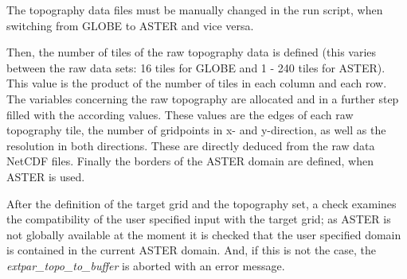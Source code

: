 \documentclass[a4paper,10pt,DIV14,BCOR1cm,titlepage,twoside]{scrartcl}
\begin{document}
The topography data files must be manually changed in the run script, when switching from GLOBE to ASTER and vice versa.\par\medskip\noindent
Then, the number of tiles of the raw topography data is defined (this varies between the raw data sets: 16 tiles for GLOBE and 1 - 240 tiles for ASTER). This value is the product of the number of tiles in each column and each row. The variables concerning the raw topography are allocated and in a further step filled with the according values. These values are the edges of each raw topography tile, the number of gridpoints in x- and y-direction, as well as the resolution in both directions. These are directly deduced from the raw data NetCDF files. Finally the borders of the ASTER domain are defined, when ASTER is used.\par\medskip\noindent
After the definition of the target grid and the topography set, a check examines the compatibility of the user specified input with the target grid; as ASTER is not globally available at the moment it is checked that the user specified domain is contained in the current ASTER domain. And, if this is not the case, the \textit{extpar\_topo\_to\_buffer} is aborted with an error message.\par\medskip\noindent
\end{document}
